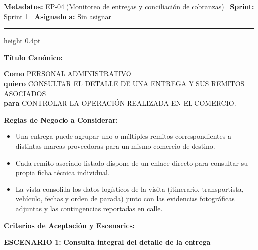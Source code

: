\documentclass[a4paper,9pt]{article}
\begin{document}
\begin{tcolorbox}[hucard, title={\textbf{HU-18: CONSULTAR DETALLE DE ENTREGA} \hfill \scriptsize \colorbox{bluestatus}{\textbf{\ New\ }} \quad \colorbox{white}{\textcolor{primarydark}{\textbf{\ 2 pts\ }}}}]
\vspace{-1pt}
\noindent\textbf{\footnotesize Metadatos:} EP-04 (Monitoreo de entregas y conciliación de cobranzas) \textbar\ \textbf{Sprint:} Sprint 1 \textbar\ \textbf{Asignado a:} Sin asignar\par\vspace{2pt}
\hrule height 0.4pt\par\vspace{3pt}
\noindent\textbf{\footnotesize Título Canónico:}\par\vspace{1pt}
{\small \textbf{Como} PERSONAL ADMINISTRATIVO \\ \textbf{quiero} CONSULTAR EL DETALLE DE UNA ENTREGA Y SUS REMITOS ASOCIADOS \\ \textbf{para} CONTROLAR LA OPERACIÓN REALIZADA EN EL COMERCIO.}\par\vspace{3pt}
\noindent\textbf{\footnotesize Reglas de Negocio a Considerar:}\par\vspace{1pt}
{\footnotesize
\begin{itemize}[leftmargin=12pt, nosep, itemsep=1.5pt, topsep=1pt]
\item Una entrega puede agrupar uno o múltiples remitos correspondientes a distintas marcas proveedoras para un mismo comercio de destino.
\item Cada remito asociado listado dispone de un enlace directo para consultar su propia ficha técnica individual.
\item La vista consolida los datos logísticos de la visita (itinerario, transportista, vehículo, fechas y orden de parada) junto con las evidencias fotográficas adjuntas y las contingencias reportadas en calle.
\end{itemize}
}\par\vspace{3pt}
\noindent\textbf{\footnotesize Criterios de Aceptación y Escenarios:}\par\vspace{2pt}
{\footnotesize
\noindent\textbf{\textcolor{secondarydark}{ESCENARIO 1:  Consulta integral del detalle de la entrega}}\par\vspace{1pt}
}
\end{tcolorbox}
\end{document}

